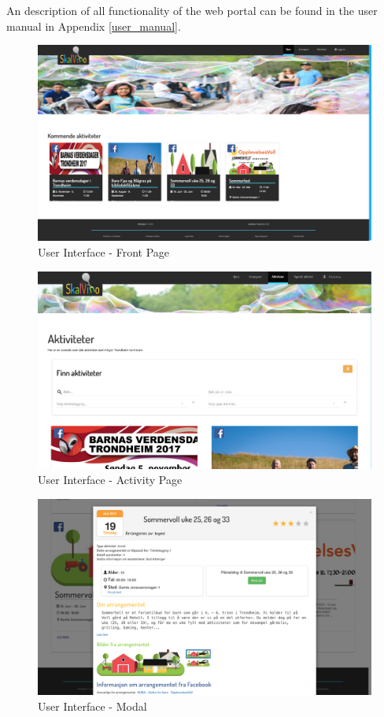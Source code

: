 An description of all functionality of the web portal can be found in the user manual in Appendix \ref{user_manual}.

\begin{figure}[H]
\centering
    \includegraphics[width=\textwidth]{fig/frontPage.png}
\caption{User Interface - Front Page}
\label{Front Page}
\end{figure}

\begin{figure}[H]
\centering
    \includegraphics[width=\textwidth]{fig/allActivities.png}
\caption{User Interface - Activity Page}
\label{All Activities}
\end{figure}

\begin{figure}[H]
\centering
    \includegraphics[width=\textwidth]{fig/modal.png}
\caption{User Interface - Modal}
\label{Modal}
\end{figure}

\cleardoublepage